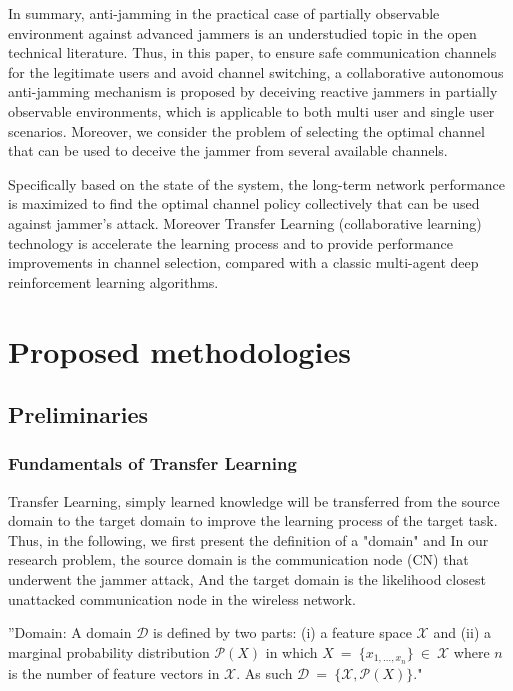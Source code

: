 \documentclass[letterpaper%
, oneside%
, 12pt%
,thesepararticles%
, english%
,creativecommons,hyperref, withAlgo2e%
]{thETS}
\begin{document}
In summary, anti-jamming in the practical case of partially observable environment against advanced jammers is an understudied topic in the open technical literature. Thus, in this paper, to ensure safe communication channels for the legitimate users and avoid channel switching, a collaborative autonomous anti-jamming mechanism is proposed by deceiving reactive jammers in partially observable environments, which is applicable to both multi user and single user scenarios. Moreover, we consider the problem of selecting the optimal channel that can be used to deceive the jammer from several available channels.

Specifically based on the state of the system, the long-term network performance is maximized to find the optimal channel policy collectively that can be used against jammer's attack. Moreover Transfer Learning (collaborative learning) technology is accelerate the learning process and to provide performance improvements in channel selection, compared with a classic multi-agent deep reinforcement learning algorithms.




\chapter{Proposed methodologies}

\section{Preliminaries}


\subsection{Fundamentals of Transfer Learning}


Transfer Learning, simply learned knowledge will be transferred from the source domain to the target domain to improve the learning process of the target task. Thus, in the following, we first present the definition of a "domain" and  In our research problem, the source domain is the communication node (CN) that underwent the jammer attack, And the target domain is the likelihood closest unattacked communication node in the wireless network.

\begin{definition}
''Domain: A domain $\displaystyle \mathcal{D}$ is defined by two parts: (i) a feature space $\displaystyle \mathcal{X}$ and (ii) a marginal probability distribution $\displaystyle \mathcal{P}( X)$ in which $\displaystyle X\ =\ \{x_{1,\dotsc ,x_{n}}\} \ \in \ \mathcal{X}$ where $\displaystyle n$ is the number of feature vectors in $\displaystyle \mathcal{X} .$ As such $\displaystyle \mathcal{D} \ =\ \{\mathcal{X} ,\mathcal{P}( X)\}$."
\end{definition}
\end{document}
